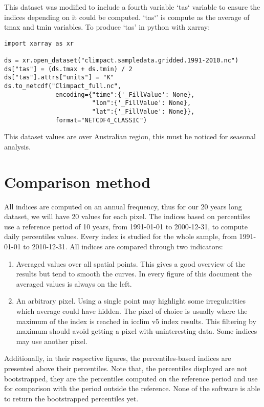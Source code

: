 \documentclass[a4paper,11pt]{article}
\begin{document}
        This dataset was modified to include a fourth variable `tas` variable to ensure the indices depending on it could be computed.
        `tas`' is compute as the average of tmax and tmin variables.
        To produce `tas' in python with xarray:
        \begin{minipage}{\linewidth}
        \begin{lstlisting}
import xarray as xr

ds = xr.open_dataset("climpact.sampledata.gridded.1991-2010.nc")
ds["tas"] = (ds.tmax + ds.tmin) / 2
ds["tas"].attrs["units"] = "K"
ds.to_netcdf("Climpact_full.nc",
              encoding={"time":{'_FillValue': None},
                        "lon":{'_FillValue': None},
                        "lat":{'_FillValue': None}},
              format="NETCDF4_CLASSIC")
        \end{lstlisting}
        \end{minipage}

        This dataset values are over Australian region, this must be noticed for seasonal analysis.

    \section{Comparison method}
        All indices are computed on an annual frequency, thus for our 20 years long dataset, we will have 20 values for each pixel.
        The indices based on percentiles use a reference period of 10 years, from 1991-01-01 to 2000-12-31, to compute daily percentiles values.
        Every index is studied for the whole sample, from 1991-01-01 to 2010-12-31.
        All indices are compared through two indicators: 
        \begin{enumerate}
            \item Averaged values over all spatial points. 
                This gives a good overview of the results but tend to smooth the curves. In every figure of this document the averaged values is always on the left.
            \item An arbitrary pixel. 
                Using a single point may highlight some irregularities which average could have hidden. 
                The pixel of choice is usually where the maximum of the index is reached in icclim v5 index results. 
                This filtering by maximum should avoid getting a pixel with uninteresting data. Some indices may use another pixel.
        \end{enumerate}
        Additionally, in their respective figures, the percentiles-based indices are presented above their percentiles. 
        Note that, the percentiles displayed are not bootstrapped, they are the percentiles computed on the reference period and use for comparison with the period outside the reference. 
        None of the software is able to return the bootstrapped percentiles yet.\\
        
\end{document}

